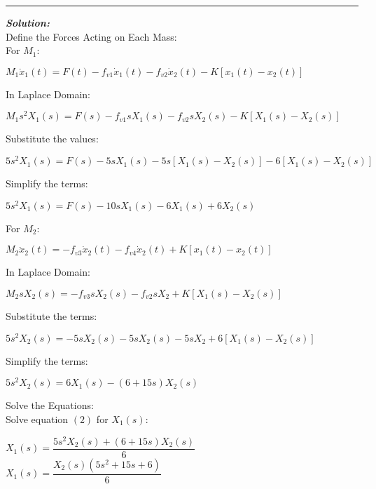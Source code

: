 \documentclass[11pt,letterpaper]{article}
\begin{document}
\rule{\textwidth}{1pt}
\vspace{12pt}
\textit{\textbf{Solution:}}\\
Define the Forces Acting on Each Mass:\\[12pt]
For $M_1$:\\[12pt]
\begin{center}
	$M_1\ddot{x}_1(t)=F(t)-f_{v1}\dot{x}_1(t)-f_{v2}\dot{x}_2(t)-K[x_1(t)-x_2(t)]$\\
\end{center}
In Laplace Domain:\\
\begin{center}
	$M_1s^2X_1(s)=F(s)-f_{v1}sX_1(s)-f_{v2}sX_2(s)-K[X_1(s)-X_2(s)]$\\
\end{center}
Substitute the values:\\
\begin{center}
	$5s^2X_1(s)=F(s)-5sX_1(s)-5s[X_1(s)-X_2(s)]-6[X_1(s)-X_2(s)]$\\
\end{center}
Simplify the terms:\\
\begin{center}
	$5s^2X_1(s)=F(s)-10sX_1(s)-6X_1(s)+6X_2(s)$\\
\end{center}
For $M_2$:\\[12pt]
\begin{center}
	$M_2\ddot{x}_2(t)=-f_{v3}\dot{x}_2(t)-f_{v4}\dot{x}_2(t)+K[x_1(t)-x_2(t)]$\\
\end{center}
In Laplace Domain:\\
\begin{center}
	$M_2sX_2(s)=-f_{v3}sX_2(s)-f_{v2}sX_2+K[X_1(s)-X_2(s)]$\\
\end{center}
Substitute the terms:\\
\begin{center}
	$5s^2X_2(s)=-5sX_2(s)-5sX_2(s)-5sX_2+6[X_1(s)-X_2(s)]$\\
\end{center}
Simplify the terms:\\
\begin{center}
	$5s^2X_2(s)=6X_1(s)-(6+15s)X_2(s)$\\
\end{center}
Solve the Equations:\\[12pt]
Solve equation $(2)$ for $X_1(s)$:\\
\begin{center}
	$X_1(s)=\dfrac{5s^2X_2(s)+(6+15s)X_2(s)}{6}$\\[12pt]
	$X_1(s)=\dfrac{X_2(s)(5s^2+15s+6)}{6}$\\[12pt]
\end{center}
\end{document}

